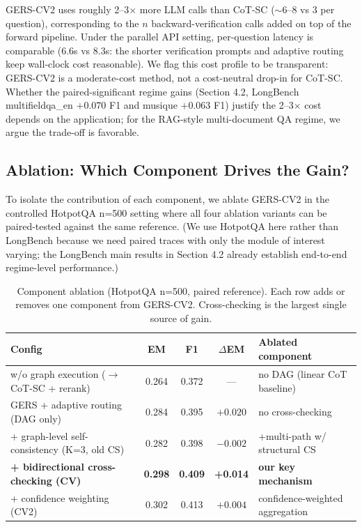 \documentclass[11pt,a4paper]{article}
\begin{document}
GERS-CV2 uses roughly 2--3$\times$ more LLM calls than CoT-SC ($\sim$6--8 vs 3 per question), corresponding to the $n$ backward-verification calls added on top of the forward pipeline. Under the parallel API setting, per-question latency is comparable (6.6s vs 8.3s: the shorter verification prompts and adaptive routing keep wall-clock cost reasonable). We flag this cost profile to be transparent: GERS-CV2 is a moderate-cost method, not a cost-neutral drop-in for CoT-SC. Whether the paired-significant regime gains (Section 4.2, LongBench multifieldqa\_en $+0.070$ F1 and musique $+0.063$ F1) justify the 2--3$\times$ cost depends on the application; for the RAG-style multi-document QA regime, we argue the trade-off is favorable.

\subsection{Ablation: Which Component Drives the Gain?}

To isolate the contribution of each component, we ablate GERS-CV2 in the controlled HotpotQA n=500 setting where all four ablation variants can be paired-tested against the same reference. (We use HotpotQA here rather than LongBench because we need paired traces with only the module of interest varying; the LongBench main results in Section 4.2 already establish end-to-end regime-level performance.)

\begin{table}[h]
\centering
\caption{Component ablation (HotpotQA n=500, paired reference). Each row adds or removes one component from GERS-CV2. Cross-checking is the largest single source of gain.}
\label{tab:ablation}
\begin{tabular}{lcccl}
\toprule
Config & EM & F1 & $\Delta$EM & Ablated component \\
\midrule
w/o graph execution (${\to}$ CoT-SC + rerank) & 0.264 & 0.372 & --- & no DAG (linear CoT baseline) \\
GERS + adaptive routing (DAG only) & 0.284 & 0.395 & $+0.020$ & no cross-checking \\
\quad + graph-level self-consistency (K=3, old CS) & 0.282 & 0.398 & $-0.002$ & +multi-path w/ structural CS \\
\quad \textbf{+ bidirectional cross-checking (CV)} & \textbf{0.298} & \textbf{0.409} & \textbf{+0.014} & \textbf{our key mechanism} \\
\quad \quad + confidence weighting (CV2) & 0.302 & 0.413 & $+0.004$ & confidence-weighted aggregation \\
\bottomrule
\end{tabular}
\end{table}
\end{document}
